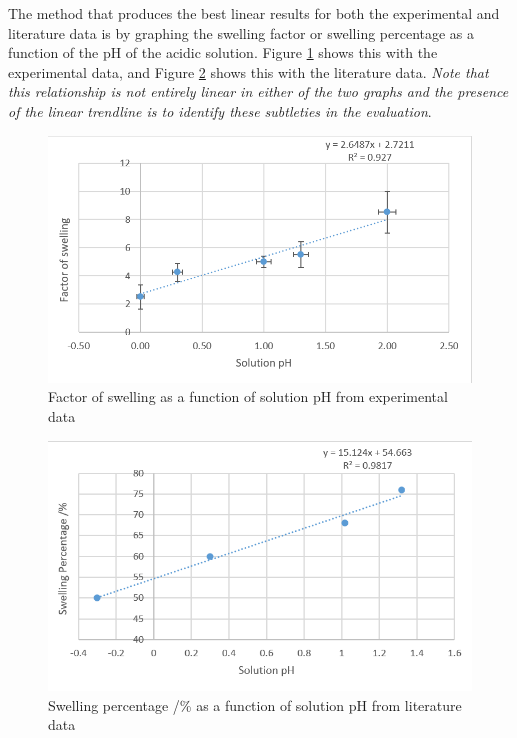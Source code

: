 \documentclass[11pt, letterpaper]{article}
\begin{document}
The method that produces the best linear results for both the experimental and literature data is by graphing
the swelling factor or swelling percentage as a function of
the pH of the acidic solution. Figure \ref*{fig:experimentalPH} shows this with the experimental
data, and Figure \ref*{fig:literaturePH} shows this with the literature data.
\textit{Note that this relationship is not entirely linear in either of the
    two graphs and the presence of the linear trendline is to identify these subtleties
    in the evaluation}.

\begin{paracol}{2}
    \begin{figure}[H]
        \centering
        \includegraphics[width=\linewidth]{experimentalPH.png}
        \caption{Factor of swelling as a function of solution pH from experimental data}
        \label{fig:experimentalPH}
    \end{figure}
    \switchcolumn
    \begin{figure}[H]
        \centering
        \includegraphics[width=\linewidth]{literaturePH.png}
        \caption{Swelling percentage /\% as a function of solution pH from literature data \protect\cite{ramavaraprasadSwellingCharacteristicsSoils2018a}}
        \label{fig:literaturePH}
    \end{figure}
\end{paracol}
\end{document}
